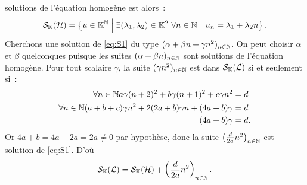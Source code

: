 \begin{itemize}
\begin{itemize}
        solutions de l'équation homogène est alors~:
        \begin{equation}
          \mathcal{S}_{\mathbb{K}}(\mathcal{H}) = \left\{u \in \mathbb{K}^{\mathbb{N}}\mathrel{}\middle|\mathrel{}\exists (\lambda_1, \lambda_2) \in 
          \mathbb{K}^2 \ \forall n \in \mathbb{N} \quad u_n = \lambda_1+\lambda_2 n\right\}.
        \end{equation}
        Cherchons une solution de \eqref{eq:S1} du type \((\alpha+\beta n + 
        \gamma n^2)_{n \in \mathbb{N}}\). On peut choisir \(\alpha\) et \(\beta\) 
        quelconques puisque les suites \((\alpha+\beta n)_{n \in \mathbb{N}}\) sont 
        solutions de l'équation homogène. Pour tout scalaire \(\gamma\), la 
        suite \((\gamma n^2)_{n \in \mathbb{N}}\) est dans \(\mathcal{S}_{\mathbb{K}}(\mathcal{L})\) si et 
        seulement si~:
        \begin{align}
          \forall n \in \mathbb{N} a\gamma(n+2)^2 +b\gamma(n+1)^2 +c\gamma n^2 &=d\\
          \forall n \in \mathbb{N} (a+b+c)\gamma n^2 +2(2a+b)\gamma n +(4a+b)\gamma 
          &=d \\
          (4a+b)\gamma &=d.
        \end{align}
        Or \(4a+b=4a-2a=2a \neq 0\) par hypothèse, donc la suite 
        \(\left(\frac{d}{2a} n^2\right)_{n \in \mathbb{N}}\) est solution de 
        \eqref{eq:S1}. D'où
        \begin{equation}
          \mathcal{S}_{\mathbb{K}}(\mathcal{L}) = \mathcal{S}_{\mathbb{K}}(\mathcal{H}) + \left(\frac{d}{2a} n^2\right)_{n \in \mathbb{N}}.
        \end{equation}
    \end{itemize}
\end{itemize}
